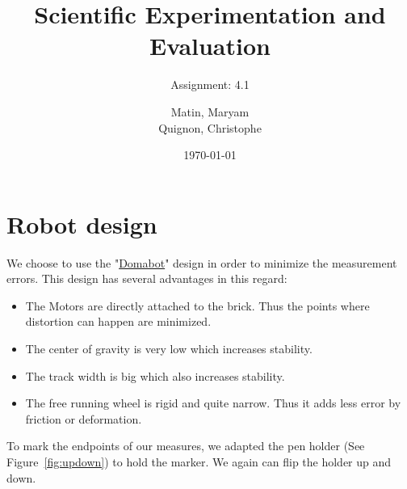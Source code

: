 \documentclass{scrartcl}
\begin{document}
\title{Scientific Experimentation and Evaluation
}
\subtitle{
Assignment: 4.1}
\author{
  Matin, Maryam \\
  Quignon, Christophe
}
\date{\today}


\maketitle


\section{Robot design}
We choose to use the "\href{http://www.damienkee.com/home/2011/8/20/domabot-classroom-robot-design.html}{Domabot}" design in order to minimize the measurement errors. This design has several advantages in this regard:
\begin{itemize}
\item The Motors are directly attached to the brick. Thus the points where distortion can happen are minimized.
\item The center of gravity is very low which increases stability.
\item The track width is big which also increases stability.
\item The free running wheel is rigid and quite narrow. Thus it adds less error by friction or deformation.
\end{itemize}

To mark the endpoints of our measures, we adapted the pen holder  (See Figure~\ref{fig:updown}) to hold the marker. We again can flip the holder up and down.
\end{document}
